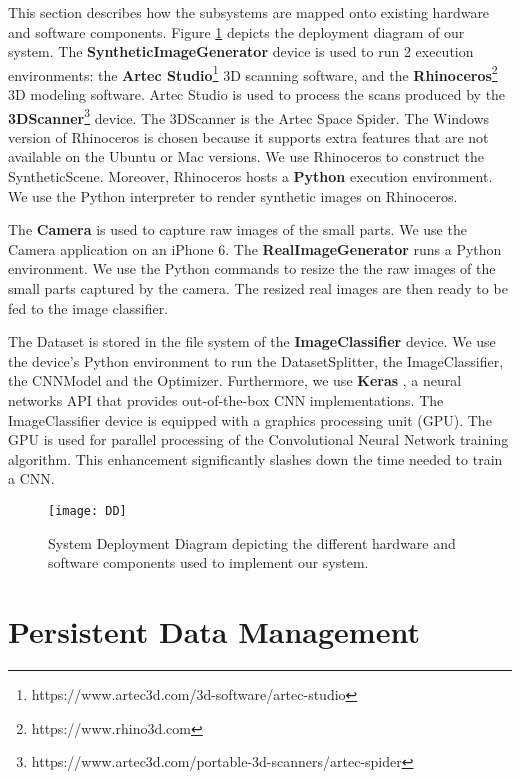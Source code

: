 This section describes how the subsystems are mapped onto existing hardware and software components. Figure \ref{fig:DD} depicts the deployment diagram of our system. The \textbf{SyntheticImageGenerator} device is used to run 2 execution environments: the \textbf{Artec Studio}\footnote{https://www.artec3d.com/3d-software/artec-studio} 3D scanning software, and the \textbf{Rhinoceros}\footnote{https://www.rhino3d.com} 3D modeling software. Artec Studio is used to process the scans produced by the \textbf{3DScanner}\footnote{https://www.artec3d.com/portable-3d-scanners/artec-spider} device. The 3DScanner is the Artec Space Spider. The Windows version of Rhinoceros is chosen because it supports extra features that are not available on the Ubuntu or Mac versions. We use Rhinoceros to construct the SyntheticScene. Moreover, Rhinoceros hosts a \textbf{Python} execution environment. We use the Python interpreter to render synthetic images on Rhinoceros.

The \textbf{Camera} is used to capture raw images of the small parts. We use the Camera application on an iPhone 6. The \textbf{RealImageGenerator} runs a Python environment. We use the Python commands to resize the the raw images of the small parts captured by the camera. The resized real images are then ready to be fed to the image classifier.

The Dataset is stored in the file system of the \textbf{ImageClassifier} device. We use the device's Python environment to run the DatasetSplitter, the ImageClassifier, the CNNModel and the Optimizer. Furthermore, we use \textbf{Keras} \cite{chollet2015keras}, a neural networks API that provides out-of-the-box CNN implementations. The ImageClassifier device is equipped with a graphics processing unit (GPU). The GPU is used for parallel processing of the Convolutional Neural Network training algorithm. This enhancement significantly slashes down the time needed to train a CNN.

\begin{figure}[H]
\centering
  \texttt{[image: DD]}
\caption{System Deployment Diagram depicting the different hardware and software components used to implement our system.}
\label{fig:DD}
\end{figure}

\section{Persistent Data Management}\label{sec:persistent_data_management}


